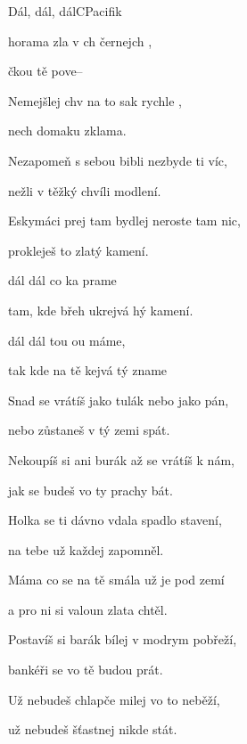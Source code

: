 \begin{song}{Dál, dál, dál}{C}{Pacifik}
  \begin{SBVerse}
 horama zla v ch černejch ,

čkou tě  pove--

Nemejšlej chv na to sak rychle ,

nech domaku zklama.
\end{SBVerse}
\begin{SBVerse}
Nezapomeň s sebou bibli nezbyde ti víc,

nežli v těžký chvíli modlení.

Eskymáci prej tam bydlej neroste tam nic,

prokleješ to zlatý kamení.

\end{SBVerse}

\begin{SBChorus}
 dál dál co ka prame

tam, kde břeh ukrejvá hý kamení.

 dál dál tou ou máme,

tak kde na tě kejvá tý zname
\end{SBChorus}

\begin{SBVerse}
Snad se vrátíš jako tulák nebo jako pán,

nebo zůstaneš v tý zemi spát.

Nekoupíš si ani burák až se vrátíš k nám,

jak se budeš vo ty prachy bát.
\end{SBVerse}
\begin{SBVerse}
Holka se ti dávno vdala spadlo stavení,

na tebe už každej zapomněl.

Máma co se na tě smála už je pod zemí 

a pro ni si valoun zlata chtěl.
\end{SBVerse}

\begin{SBChorus}
\end{SBChorus}

\begin{SBVerse}
Postavíš si barák bílej v modrym pobřeží,

bankéři se vo tě budou prát.

Už nebudeš chlapče milej vo to neběží,

už nebudeš šťastnej nikde stát.
\end{SBVerse}

\begin{SBChorus}
\end{SBChorus}
\end{song}
\pagebreak
